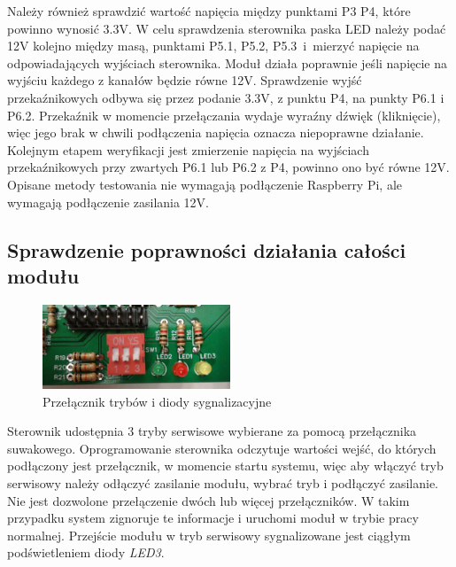 \documentclass[12pt, eng, twoside, openany, final]{mgr}
\begin{document}
            Należy również sprawdzić wartość napięcia między punktami P3 P4, które powinno wynosić 3.3V.
            W celu sprawdzenia sterownika paska LED należy podać 12V kolejno między masą, punktami P5.1, P5.2, P5.3~i~mierzyć napięcie na odpowiadających wyjściach sterownika. Moduł działa poprawnie jeśli napięcie na wyjściu każdego z kanałów będzie równe 12V.
            Sprawdzenie wyjść przekaźnikowych odbywa się przez podanie 3.3V, z punktu P4, na punkty P6.1 i P6.2.
            Przekaźnik w momencie przełączania wydaje wyraźny dźwięk (kliknięcie), więc jego brak w chwili podłączenia napięcia oznacza niepoprawne działanie. Kolejnym etapem weryfikacji jest zmierzenie napięcia na wyjściach przekaźnikowych przy zwartych P6.1 lub P6.2 z P4, powinno ono być równe 12V. Opisane metody testowania nie wymagają podłączenie Raspberry Pi, ale wymagają podłączenie zasilania 12V. 
            
            \subsection{Sprawdzenie poprawności działania całości modułu}
                \begin{figure}[H]
                \begin{center}
                    \includegraphics[width=0.5\textwidth]{dip_zoom.jpg}
                    \caption{Przełącznik trybów i diody sygnalizacyjne}
                \end{center}
                \end{figure}
            Sterownik udostępnia 3 tryby serwisowe wybierane za pomocą przełącznika suwakowego.
            Oprogramowanie sterownika odczytuje wartości wejść, do których podłączony jest przełącznik, w momencie startu systemu, więc aby włączyć tryb serwisowy należy odłączyć zasilanie modułu, wybrać tryb i podłączyć zasilanie. Nie jest dozwolone przełączenie dwóch lub więcej przełączników. W takim przypadku system zignoruje te informacje i uruchomi moduł w trybie pracy normalnej. Przejście modułu w tryb serwisowy sygnalizowane jest ciągłym podświetleniem diody \emph{LED3}.
            
\end{document}

